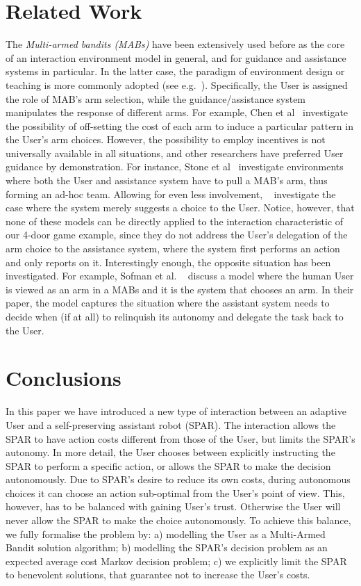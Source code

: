 \documentclass{msdm2012}
\begin{document}
\section{Related Work}\label{rel_work}
The {\em Multi-armed bandits (MABs)} have been extensively used before
as the core of an interaction environment model in general, and for
guidance and assistance systems in particular. In the latter case, the
paradigm of environment design or teaching is more commonly adopted
(see e.g.~\cite{Zhang09:General,rdlj_2010_aamas}). Specifically, the
User is assigned the role of MAB's arm selection, while the
guidance/assistance system manipulates the response of different
arms. For example, Chen et al~\cite{chen_etal_2011} investigate the
possibility of off-setting the cost of each arm to induce a particular
pattern in the User's arm choices. However, the possibility to employ
incentives is not universally available in all situations, and other
researchers have preferred User guidance by demonstration. For
instance, Stone et al~\cite{stone_kraus_2010, barrett_stone_2011}
investigate environments where both the User and assistance system
have to pull a MAB's arm, thus forming an ad-hoc team. Allowing for
even less involvement, ~\cite{arkgg_2012} investigate the case where
the system merely suggests a choice to the User. Notice, however, that
none of these models can be directly applied to the interaction
characteristic of our 4-door game example, since they do not address
the User's delegation of the arm choice to the assistance system,
where the system first performs an action and only reports on
it. Interestingly enough, the opposite situation has been
investigated. For example, Sofman et
al. ~\cite{sofman_bagnell_stentz_2009} discuss a model where the human
User is viewed as an arm in a MABs and it is the system that chooses
an arm. In their paper, the model captures the situation where the
assistant system needs to decide when (if at all) to relinquish its
autonomy and delegate the task back to the User.

\section{Conclusions}\label{conclusions}

In this paper we have introduced a new type of interaction between an
adaptive User and a self-preserving assistant robot (SPAR). The
interaction allows the SPAR to have action costs different from those
of the User, but limits the SPAR's autonomy. In more detail, the User
chooses between explicitly instructing the SPAR to perform a specific
action, or allows the SPAR to make the decision autonomously. Due to
SPAR's desire to reduce its own costs, during autonomous choices it
can choose an action sub-optimal from the User's point of view. This,
however, has to be balanced with gaining User's trust. Otherwise the
User will never allow the SPAR to make the choice autonomously. To
achieve this balance, we fully formalise the problem by: a) modelling
the User as a Multi-Armed Bandit solution algorithm; b) modelling the
SPAR's decision problem as an expected average cost Markov decision
problem; c) we explicitly limit the SPAR to benevolent solutions,
that guarantee not to increase the User's costs.
\end{document}
